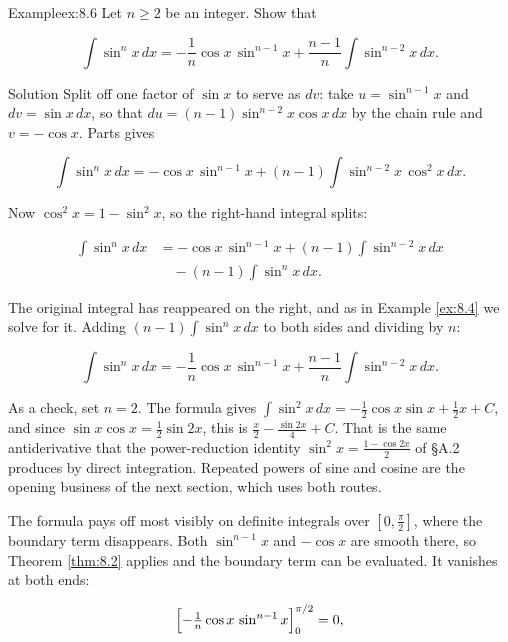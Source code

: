 \documentclass[a4paper,12pt,oneside]{memoir}
\begin{document}
\begin{workedexample}
\begin{envexample}{Example}{ex:8.6}{}
Let \(n \ge 2\) be an integer. Show that

\[ \int \sin^{n}x\,dx = -\frac{1}{n}\cos x\,\sin^{n-1}x + \frac{n-1}{n}\int \sin^{n-2}x\,dx. \]
\end{envexample}
\begin{envsolution}{Solution}{}{}
Split off one factor of \(\sin x\) to serve as \(dv\): take \(u = \sin^{n-1}x\) and \(dv = \sin x\,dx\), so that \(du = (n-1)\sin^{n-2}x\cos x\,dx\) by the chain rule and \(v = -\cos x\). Parts gives

\[ \int \sin^{n}x\,dx = -\cos x\,\sin^{n-1}x + (n-1)\int \sin^{n-2}x\,\cos^{2}x\,dx. \]

Now \(\cos^{2}x = 1 - \sin^{2}x\), so the right-hand integral splits:

\[ \begin{aligned}
          \int \sin^{n}x\,dx &= -\cos x\,\sin^{n-1}x + (n-1)\int \sin^{n-2}x\,dx \\
            &\quad - (n-1)\int \sin^{n}x\,dx.
        \end{aligned} \]

The original integral has reappeared on the right, and as in Example \ref{ex:8.4} we solve for it. Adding \((n-1)\int\sin^{n}x\,dx\) to both sides and dividing by \(n\):

\[ \int \sin^{n}x\,dx = -\frac{1}{n}\cos x\,\sin^{n-1}x + \frac{n-1}{n}\int \sin^{n-2}x\,dx. \]

As a check, set \(n = 2\). The formula gives \(\int\sin^{2}x\,dx = -\tfrac{1}{2}\cos x\sin x + \tfrac{1}{2}x + C\), and since \(\sin x\cos x = \tfrac{1}{2}\sin 2x\), this is \(\tfrac{x}{2} - \tfrac{\sin 2x}{4} + C\). That is the same antiderivative that the power-reduction identity \(\sin^{2}x = \tfrac{1 - \cos 2x}{2}\) of §A.2 produces by direct integration. Repeated powers of sine and cosine are the opening business of the next section, which uses both routes. \qedmark
\end{envsolution}
\end{workedexample}
The formula pays off most visibly on definite integrals over \([0, \tfrac{\pi}{2}]\), where the boundary term disappears. Both \(\sin^{n-1}x\) and \(-\cos x\) are smooth there, so Theorem \ref{thm:8.2} applies and the boundary term can be evaluated. It vanishes at both ends:

\[ \Bigl[-\tfrac{1}{n}\cos x\,\sin^{n-1}x\Bigr]_{0}^{\pi/2} = 0, \]
\end{document}
